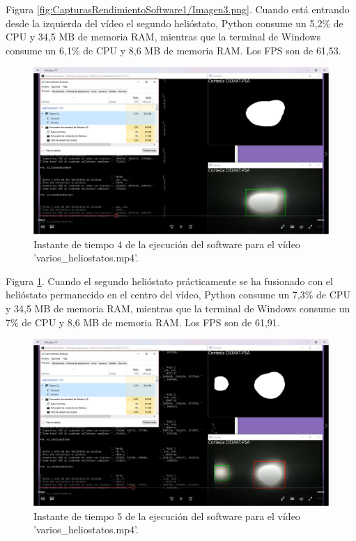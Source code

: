 Figura \ref{fig:CapturasRendimientoSoftware1/Imagen3.png}. Cuando está entrando desde la izquierda del vídeo el segundo helióstato, Python consume un 5,2\% de CPU y 34,5 MB de memoria RAM, mientras que la terminal de Windows consume un 6,1\% de CPU y 8,6 MB de memoria RAM. Los FPS son de 61,53.\\[20pt]

\begin{figure}[h!]
  	\centering
	\includegraphics[width=\textwidth]{CapturasRendimientoSoftware1/Imagen4.png}
	\caption{Instante de tiempo 4 de la ejecución del software para el vídeo 'varios\_heliostatos.mp4'.
	\label{fig:CapturasRendimientoSoftware1/Imagen4.png}}
\end{figure}

Figura \ref{fig:CapturasRendimientoSoftware1/Imagen4.png}. Cuando el segundo helióstato prácticamente se ha fusionado con el helióstato permanecido en el centro del vídeo, Python consume un 7,3\% de CPU y 34,5 MB de memoria RAM, mientras que la terminal de Windows consume un 7\% de CPU y 8,6 MB de memoria RAM. Los FPS son de 61,91.\\[20pt]

\begin{figure}[h!]
  	\centering
	\includegraphics[width=\textwidth]{CapturasRendimientoSoftware1/Imagen5.png}
	\caption{Instante de tiempo 5 de la ejecución del software para el vídeo 'varios\_heliostatos.mp4'.
	\label{fig:CapturasRendimientoSoftware1/Imagen5.png}}
\end{figure}

